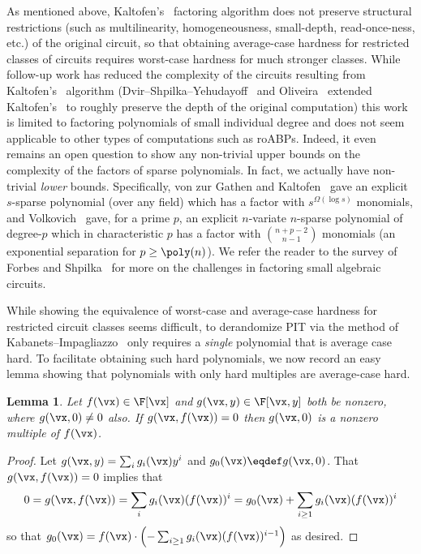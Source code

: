 \documentclass[11pt]{article}
\numberwithin{equation}{section}
\newtheorem{lemma}[theorem]{Lemma}
\theoremstyle{definition}
\theoremstyle{plain}
\begin{document}
As mentioned above, Kaltofen's~\cite{Kaltofen89} factoring algorithm does not preserve structural restrictions (such as multilinearity, homogeneousness, small-depth, read-once-ness, etc.) of the original circuit, so that obtaining average-case hardness for restricted classes of circuits requires worst-case hardness for much stronger classes.  While follow-up work has reduced the complexity of the circuits resulting from Kaltofen's~\cite{Kaltofen89} algorithm (Dvir--Shpilka--Yehudayoff~\cite{DvirSY09} and Oliveira~\cite{Oliveira15} extended Kaltofen's~\cite{Kaltofen89} to roughly preserve the depth of the original computation) %
this work is  %
limited to factoring polynomials of small individual degree and
%
does  %
not seem applicable to other types of computations such as roABPs. Indeed, it even remains an open question to show any non-trivial upper bounds on the complexity of the factors of sparse polynomials.  In fact, we actually have non-trivial \emph{lower} bounds. Specifically, von zur Gathen and Kaltofen~\cite{vzGathenKaltofen85} gave an explicit $s$-sparse polynomial (over any field) which has a factor with $s^{\Omega(\log s )}$ monomials, and Volkovich~\cite{Volkovich15} gave, for a prime $p$, an explicit $n$-variate $n$-sparse polynomial of degree-$p$ which in characteristic $p$ has a factor with $\binom{n+p-2}{n-1}$ monomials (an exponential separation for $p\ge\poly(n)$). We refer the reader to the survey of Forbes and Shpilka~\cite{ForbesShpilka15} for more on the challenges in factoring small algebraic circuits.

While showing the equivalence of worst-case and average-case hardness for restricted circuit classes seems difficult, to derandomize PIT via the method of Kabanets--Impagliazzo~\cite{KabanetsImpagliazzo04} only requires a \emph{single} polynomial that is average case hard.  To facilitate obtaining such hard polynomials, we now record an easy lemma showing that polynomials with only hard multiples are average-case hard.

\begin{lemma}\label{res:lbs-mult_to_nonroot}
        Let $f(\vx)\in\F[\vx]$ and $g(\vx,y)\in\F[\vx,y]$ both be nonzero, where $g(\vx,0)\ne 0$ also. If $g(\vx,f(\vx))=0$ then $g(\vx,0)$ is a nonzero multiple of $f(\vx)$.
\end{lemma}
\begin{proof}
        Let $g(\vx,y)=\sum_i g_i(\vx)y^i$ and $g_0(\vx)\eqdef g(\vx,0)$.  That $g(\vx,f(\vx))=0$ implies that
        \begin{align*}
                0
                =g(\vx,f(\vx))
                =\sum_i g_i(\vx)(f(\vx))^i
                =g_0(\vx)+\sum_{i\ge 1} g_i(\vx)(f(\vx))^i
        \end{align*}
        so that $g_0(\vx)=f(\vx)\cdot \left(-\sum_{i\ge 1} g_i(\vx)(f(\vx))^{i-1}\right)$ as desired.
\end{proof}
\end{document}
